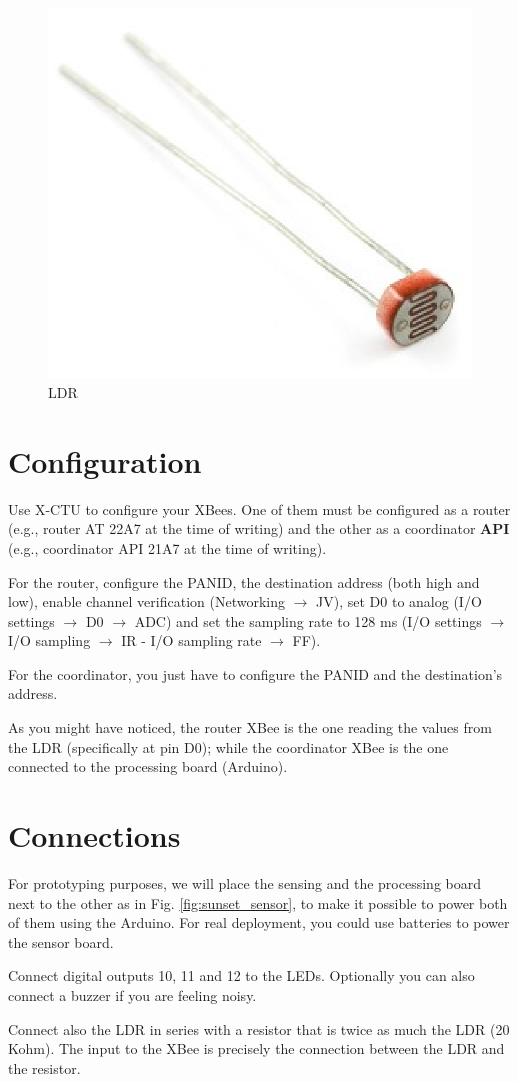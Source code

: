 \begin{figure}[htbp]
  \centering
  \includegraphics[width=0.3\linewidth]{figures/ldr.eps}
  \caption{LDR}
  \label{fig:ldr}
\end{figure}

\section{Configuration}
Use X-CTU to configure your XBees.
One of them must be configured as a router (e.g., router AT 22A7 at the time of writing) and the other as a coordinator {\bfseries API} (e.g., coordinator API 21A7 at the time of writing).

For the router, configure the PANID, the destination address (both high and low), enable channel verification (Networking $\rightarrow$  JV), set D0 to analog (I/O settings $\rightarrow$  D0 $\rightarrow$  ADC) and set the sampling rate to 128 ms (I/O settings $\rightarrow$  I/O sampling $\rightarrow$  IR - I/O sampling rate $\rightarrow$  FF).

For the coordinator, you just have to configure the PANID and the destination's address.

As you might have noticed, the router XBee is the one reading the values from the LDR (specifically at pin D0); while the coordinator XBee is the one connected to the processing board (Arduino).

\section{Connections}

For prototyping purposes, we will place the sensing and the processing board next to the other as in Fig. \ref{fig:sunset_sensor}, to make it possible to power both of them using the Arduino.
For real deployment, you could use batteries to power the sensor board.

Connect digital outputs 10, 11 and 12 to the LEDs.
Optionally you can also connect a buzzer if you are feeling noisy.

Connect also the LDR in series with a resistor that is twice as much the LDR (20 Kohm).
The input to the XBee is precisely the connection between the LDR and the resistor.

